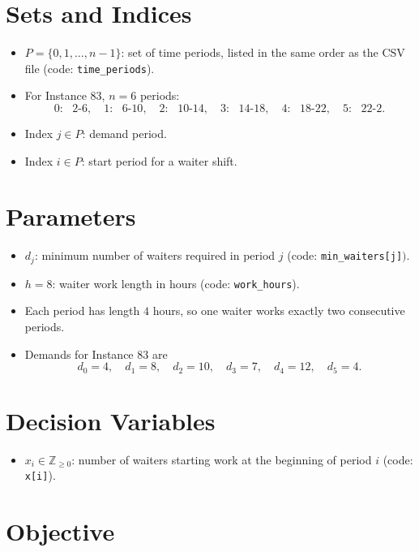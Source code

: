 \section*{Sets and Indices}

\begin{itemize}
    \item $P = \{0,1,\dots,n-1\}$: set of time periods, listed in the same order as the CSV file (code: \texttt{time\_periods}).
    \item For Instance 83, $n=6$ periods:
    \[
    0:\text{ }2\text{-}6,\quad
    1:\text{ }6\text{-}10,\quad
    2:\text{ }10\text{-}14,\quad
    3:\text{ }14\text{-}18,\quad
    4:\text{ }18\text{-}22,\quad
    5:\text{ }22\text{-}2.
    \]
    \item Index $j \in P$: demand period.
    \item Index $i \in P$: start period for a waiter shift.
\end{itemize}

\section*{Parameters}

\begin{itemize}
    \item $d_j$: minimum number of waiters required in period $j$ (code: \texttt{min\_waiters[j]}$)$.
    \item $h = 8$: waiter work length in hours (code: \texttt{work\_hours}).
    \item Each period has length $4$ hours, so one waiter works exactly two consecutive periods.
    \item Demands for Instance 83 are
    \[
    d_0=4,\quad d_1=8,\quad d_2=10,\quad d_3=7,\quad d_4=12,\quad d_5=4.
    \]
\end{itemize}

\section*{Decision Variables}

\begin{itemize}
    \item $x_i \in \mathbb{Z}_{\ge 0}$: number of waiters starting work at the beginning of period $i$ (code: \texttt{x[i]}).
\end{itemize}

\section*{Objective}

